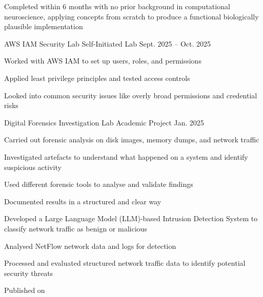     \item Completed within 6 months with no prior background in computational neuroscience, applying concepts from scratch to produce a functional biologically plausible implementation
  \itemizeEnd
  \item \projectSubheading
    {AWS IAM Security Lab}
    {Self-Initiated Lab}
    {Sept. 2025 -- Oct. 2025}
  \itemizeBegin
    \item Worked with AWS IAM to set up users, roles, and permissions
    \item Applied least privilege principles and tested access controls
    \item Looked into common security issues like overly broad permissions and credential risks
  \itemizeEnd 
  \item \projectSubheading
    {Digital Forensics Investigation Lab}
    {Academic Project}
    {Jan. 2025}
  \itemizeBegin
    \item Carried out forensic analysis on disk images, memory dumps, and network traffic
    \item Investigated artefacts to understand what happened on a system and identify suspicious activity
    \item Used different forensic tools to analyse and validate findings
    \item Documented results in a structured and clear way
  \itemizeEnd
  \item {}
  \itemizeBegin
    \item Developed a Large Language Model (LLM)-based Intrusion Detection System to classify network traffic as benign or malicious
    \item Analysed NetFlow network data and logs for detection
    \item Processed and evaluated structured network traffic data to identify potential security threats
    \item Published on 
  \itemizeEnd
\itemizeEnd

\newcommand{\otherprojects}{
  \section{Other Projects}
  \itemizeBegin
      \item \projectSubheading{Dummy Project}{Self-Initiated Project}{March. 2026 -- Apr. 2026}
    \itemizeBegin
      \item Lorem ipsum dolor sit amet, consectetur adipiscing elit. Sed convallis magna id ornare sagittis. 
      \item In nec leo dui. Donec purus ligula, ullamcorper ac lorem a, vulputate euismod felis. 
      \item Aenean quis lectus vel ligula porta consectetur vel mollis diam. Pellentesque mi mi, porttitor vel nunc ut. pretium tempor nisl. 
      \item Aenean vestibulum orci sed justo ullamcorper pulvinar. Curabitur dictum eros elementum, maximus diam ac, fermentum orci. 
    \itemizeEnd
  \itemizeEnd
  
}